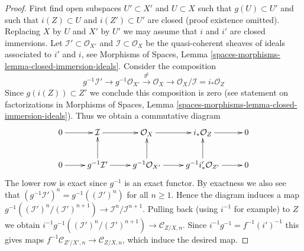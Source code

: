 \documentclass[10pt,a4paper]{amsart}
\theoremstyle{plain}
\theoremstyle{definition}
\theoremstyle{remark}
\numberwithin{equation}{subsection}
\begin{document}
\begin{proof}
First find open subspaces $U' \subset X'$ and $U \subset X$ such that
$g(U) \subset U'$ and such that $i(Z) \subset U$ and $i(Z') \subset U'$
are closed (proof existence omitted). Replacing $X$ by $U$ and $X'$ by
$U'$ we may assume that $i$ and $i'$ are closed immersions.
Let $\mathcal{I}' \subset \mathcal{O}_{X'}$ and
$\mathcal{I} \subset \mathcal{O}_X$ be the quasi-coherent sheaves of
ideals associated to $i'$ and $i$, see
Morphisms of Spaces, Lemma \ref{spaces-morphisms-lemma-closed-immersion-ideals}.
Consider the composition
$$
g^{-1}\mathcal{I}' \to g^{-1}\mathcal{O}_{X'}
\xrightarrow{g^\sharp} \mathcal{O}_X \to
\mathcal{O}_X/\mathcal{I} = i_*\mathcal{O}_Z
$$
Since $g(i(Z)) \subset Z'$ we conclude this composition is zero (see
statement on factorizations in
Morphisms of Spaces,
Lemma \ref{spaces-morphisms-lemma-closed-immersion-ideals}).
Thus we obtain a commutative diagram
$$
\xymatrix{
0 \ar[r] &
\mathcal{I} \ar[r] &
\mathcal{O}_X \ar[r] &
i_*\mathcal{O}_Z \ar[r] &
0 \\
0 \ar[r] &
g^{-1}\mathcal{I}' \ar[r] \ar[u] &
g^{-1}\mathcal{O}_{X'} \ar[r] \ar[u] &
g^{-1}i'_*\mathcal{O}_{Z'} \ar[r] \ar[u] &
0
}
$$
The lower row is exact since $g^{-1}$ is an exact functor.
By exactness we also see that
$(g^{-1}\mathcal{I}')^n = g^{-1}((\mathcal{I}')^n)$ for all $n \geq 1$.
Hence the diagram induces a map
$g^{-1}((\mathcal{I}')^n/(\mathcal{I}')^{n + 1}) \to
\mathcal{I}^n/\mathcal{I}^{n + 1}$.
Pulling back (using $i^{-1}$ for example) to $Z$ we obtain
$i^{-1}g^{-1}((\mathcal{I}')^n/(\mathcal{I}')^{n + 1}) \to
\mathcal{C}_{Z/X, n}$.
Since $i^{-1}g^{-1} = f^{-1}(i')^{-1}$ this gives maps
$f^{-1}\mathcal{C}_{Z'/X', n} \to \mathcal{C}_{Z/X, n}$, which induce
the desired map.
\end{proof}
\end{document}
